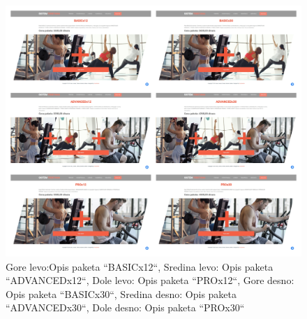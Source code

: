 \documentclass[../main.tex]{subfiles}
\begin{document}
\begin{figure}[!ht]
\begin{center}
\includegraphics[scale=0.20]{sections/korisnicki_interfejs/screenshots/programiPaketi.jpg}
\end{center}
\caption{Gore levo:Opis paketa ``BASICx12``, Sredina levo: Opis paketa ``ADVANCEDx12``, Dole levo: Opis paketa ``PROx12``, Gore desno: Opis paketa ``BASICx30``, Sredina desno: Opis paketa ``ADVANCEDx30``, Dole desno: Opis paketa ``PROx30``}
\label{fig:paketi}
\end{figure}
\end{document}
